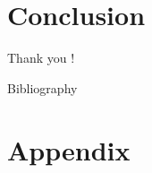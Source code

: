 \documentclass[compress,10pt,xcolor={table,dvipsnames},t]{beamer}
\begin{document}
	\section{Conclusion}
	
	
	{ 
		\begin{frame}
			\vfill
			\centering
			\LARGE Thank you !
			\vfill
		\end{frame}
	
		\begin{frame}{Bibliography}
			\small
			\printbibliography[heading=none]
		\end{frame}
	}
	\addtocounter{framenumber}{-2} 
	
	\appendix
	
	\section{Appendix}
	
	
	
\end{document}
